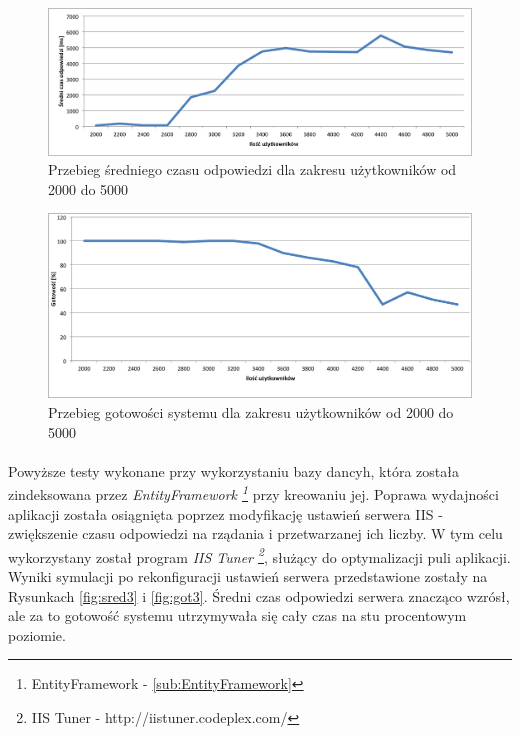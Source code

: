 \begin{figure}[ht]
	\centering
		\includegraphics[width=1\linewidth]{assets/sredni2.png}
		\caption{Przebieg średniego czasu odpowiedzi dla zakresu użytkowników od 2000 do 5000}
	\label{fig:sred2}
\end{figure}

\begin{figure}[ht]
	\centering
		\includegraphics[width=1\linewidth]{assets/gotowosc2.png}
		\caption{Przebieg gotowości systemu dla zakresu użytkowników od 2000 do 5000}
	\label{fig:got2}
\end{figure}

\paragraph{} %
\label{par:}
Powyższe testy wykonane przy wykorzystaniu bazy dancyh, która została zindeksowana przez \textit{EntityFramework \footnote{EntityFramework - \ref{sub:EntityFramework}}} przy kreowaniu jej. Poprawa wydajności aplikacji została osiągnięta poprzez modyfikację ustawień serwera IIS -  zwiększenie czasu odpowiedzi na rządania i przetwarzanej ich liczby. W tym celu wykorzystany został program \textit{IIS Tuner \footnote{IIS Tuner - http://iistuner.codeplex.com/}}, służący do optymalizacji puli aplikacji. Wyniki symulacji po rekonfiguracji ustawień serwera przedstawione zostały na Rysunkach \ref{fig:sred3} i \ref{fig:got3}. Średni czas odpowiedzi serwera znacząco wzrósł, ale za to gotowość systemu utrzymywała się cały czas na stu procentowym poziomie.

